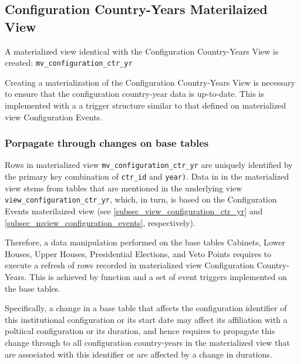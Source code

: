 \subsection{Configuration Country-Years Materilaized View}\label{subsec_mview_configuration_ctr_yr}

A materialized view identical with the Configuration Country-Years View is created: \texttt{mv\_configuration\_ctr\_yr}

Creating a materialization of the Configuration Country-Years View is necessary to ensure that the configuration country-year data is up-to-date. 
This is implemented with a a trigger structure similar to that defined on materialized view Configuration Events.

\subsubsection{Porpagate through changes on base tables}

Rows in materialized view \texttt{mv\_configuration\_ctr\_yr} are uniquely identified by the primary key combination of \texttt{ctr\_id} and  \texttt{year)}.
Data in in the materialized view stems from tables that are mentioned in the underlying view \texttt{view\_configuration\_ctr\_yr},  which, in turn, is based on the Configuration Events materilaized view (see \ref{subsec_view_configuration_ctr_yr} and \ref{subsec_mview_configuration_events}, respectively). 


Therefore, a data manipulation performed on the base tables Cabinets, Lower Houses, Upper Houses, Presidential Elections, and Veto Points requires to execute a refresh of rows recorded in materialized view Configuration Country-Years. This is achieved by function \texttt{} and a set of event triggers implemented on the base tables.

Specifically, a change in a base table that affects the configuration identifier of this institutional configuration or its start date may affect its affiliation with a poltiical configuration or its duration, and hence requires to propagate this change through to all configuration country-years in the materialized view that are associated with this identifier or are affected by a change in durations. 

